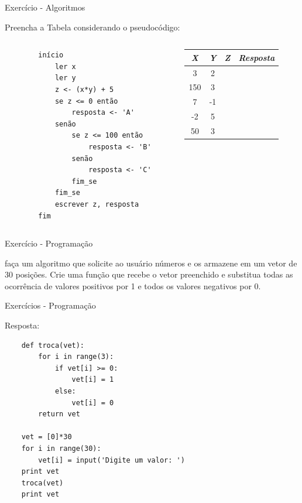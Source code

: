 \documentclass{beamer}
\begin{document}
\begin{frame}[fragile]{Exercício - Algoritmos}
	\label{exercicio_08}
	
	Preencha a Tabela considerando o pseudocódigo:
	
\begin{columns}
	\begin{column}{0.5\textwidth}
\begin{verbatim}
		início
			ler x
			ler y
			z <- (x*y) + 5
			se z <= 0 então
				resposta <- 'A'
			senão
				se z <= 100 então
					resposta <- 'B'
				senão
					resposta <- 'C'
				fim_se
			fim_se
			escrever z, resposta
		fim
\end{verbatim}
	\end{column}
	\begin{column}{0.5\textwidth}
		\begin{tabular}{|c|c|c|c|}
			\hline
			 \textbf{\textit{X}} & \textbf{\textit{Y}} & \textbf{\textit{Z}} & \textbf{\textit{Resposta}} \\
			\hline 
			3 & 2 & & \\
			\hline 
			150 & 3 & & \\
			\hline 
			7 & -1 & & \\
			\hline 
			-2 & 5 & & \\
			\hline 
			50 & 3 & & \\
			\hline
		\end{tabular}
	\end{column}
\end{columns}
\end{frame}


\begin{frame}{Exercício - Programação}
	\label{exercicio_09}
	
	faça um algoritmo que solicite ao usuário números e os armazene em um vetor de 30 posições. Crie uma função que recebe o vetor preenchido e substitua todas as ocorrência de valores positivos por 1 e todos os valores negativos por 0.
	
\end{frame}

\begin{frame}[fragile]{Exercícios - Programação}
	\label{exercicio_09_resposta}
	
	Resposta:
	
\begin{verbatim}
	def troca(vet):
		for i in range(3):
			if vet[i] >= 0:
				vet[i] = 1
			else:
				vet[i] = 0
		return vet
	
	vet = [0]*30
	for i in range(30):
		vet[i] = input('Digite um valor: ')
	print vet
	troca(vet)
	print vet
\end{verbatim}

\end{frame}
\end{document}
